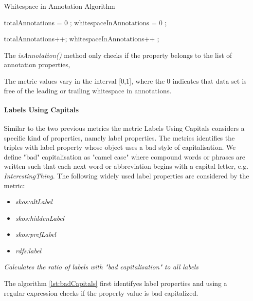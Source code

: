 \begin{algorithm}
\caption{Whitespace in Annotation Algorithm}\label{lst:whitespace}
\begin{algorithmic}[1]
\State totalAnnotations = 0 ;
\State whitespaceInAnnotations = 0 ;
\EndProcedure

 totalAnnotations++; \EndIf
{} whitespaceInAnnotations++ ; \EndIf
{}
\EndProcedure
\end{algorithmic}
\end{algorithm}

The \textit{isAnnotation()} method  only checks if the property belongs to the list of annotation properties, 

The metric values vary in the interval [0,1], where  the 0 indicates that data set is free of the leading or trailing whitespace in annotations.


\paragraph{Labels Using Capitals}

Similar to the two previous metrics the metric Labels Using Capitals considers a specific kind of properties, namely label properties.
The metrics identifies the triples with label property whose object uses a bad style of capitalisation. 
We define "bad" capitalisation as "camel case" where compound words or phrases  are written such that each next word or abbreviation begins with a capital letter, e.g. \textit{InterestingThing}.
The following widely used label properties are considered by the metric:
\begin{itemize}
\item \textit{skos:altLabel}
\item \textit{skos:hiddenLabel}
\item \textit{skos:prefLabel}
 \item \textit{rdfs:label}
		\end{itemize}



\begin{mdframed}[style=metricdefinition]
\emph{Calculates the ratio of labels with "bad capitalisation" to all labels}
\end{mdframed}

The algorithm \ref{lst:badCapitals} first identifyes label properties and using a regular expression checks if the property value is bad capitalized.


